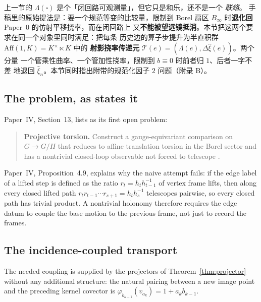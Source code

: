 
\begin{cnread}
上一节的 $\Lambda(\square)$ 是个「闭回路可观测量」，但它只是和乐，还不是一个
\emph{联络}。\AEG{} 手稿里的原始提法是：要一个规范等变的比较量，限制到
Borel 扇区 $B_\infty$ 时\textbf{退化回} Paper~0 的仿射平移挠率，而在闭回路上
又\textbf{不能被望远镜抵消}。本节把这两个要求在同一个对象里同时满足：把每条
历史边的算子步提升为半直积群 $\mathrm{Aff}(1,K)=K^\times\ltimes K$ 中的
\textbf{射影挠率传递元} $\mathcal T(e)=(\Lambda(e),\Delta\hat\xi(e))$。两个分量
一个管乘性曲率、一个管加性挠率，限制到 $b\equiv0$ 时前者归 $1$、后者一字不差
地退回 $\hat\xi_n$。本节同时指出附带的规范化因子 $2$ 问题（附录 B）。
\end{cnread}

\subsection{The problem, as \AEG{} states it}

Paper~IV, Section~13, lists as its first open problem:

\begin{quote}\small
\textbf{Projective torsion.}  Construct a gauge-equivariant comparison on
$G\to G/H$ that reduces to affine translation torsion in the Borel sector and
has a nontrivial closed-loop observable not forced to telescope \cite{AEG4}.
\end{quote}

Paper~IV, Proposition~4.9, explains why the naive attempt fails: if the edge
label of a lifted step is defined as the ratio $r_t=h_th_{t-1}^{-1}$ of vertex
frame lifts, then along every closed lifted path
$r_tr_{t-1}\cdots r_{s+1}=h_th_s^{-1}$ telescopes pairwise, so every closed path
has trivial product.  A nontrivial holonomy therefore requires the edge datum to
couple the base motion to the previous frame, not just to record the frames.

\subsection{The incidence-coupled transport}

The needed coupling is supplied by the projectors of
Theorem~\ref{thm:projector} without any additional structure: the natural pairing
between a new image point and the preceding kernel covector is
$\varphi_{b_{k-1}}(v_{a_k})=1+a_kb_{k-1}$.

